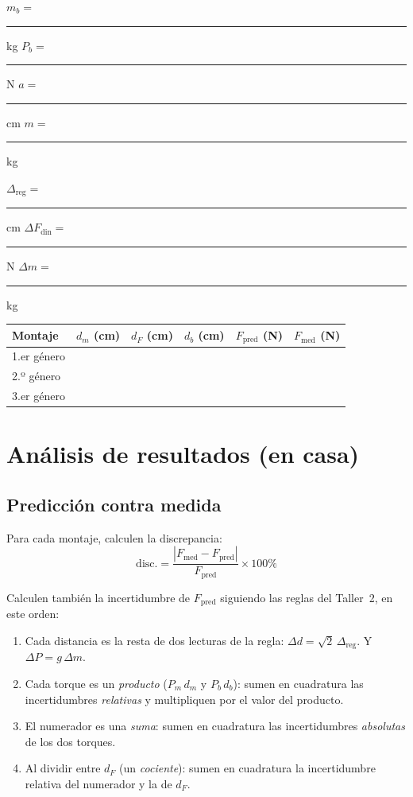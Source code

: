 \documentclass[11pt, letterpaper]{article}
\begin{document}
	\vspace{0.2cm}
	\begin{center}
		\small
		$m_b = $ \rule{1.3cm}{0.4pt} kg
		\quad
		$P_b = $ \rule{1.3cm}{0.4pt} N
		\quad
		$a = $ \rule{1.3cm}{0.4pt} cm
		\quad
		$m = $ \rule{1.3cm}{0.4pt} kg
		
		\vspace{0.15cm}
		$\Delta_{\text{reg}} = $ \rule{1.3cm}{0.4pt} cm
		\qquad
		$\Delta F_{\text{din}} = $ \rule{1.3cm}{0.4pt} N
		\qquad
		$\Delta m = $ \rule{1.3cm}{0.4pt} kg
		
		\vspace{0.4cm}
		\setlength{\tabcolsep}{4pt}
		\begin{tabular}{|l|c|c|c|c|c|}
			\hline
			Montaje & $d_m$ (cm) & $d_F$ (cm) & $d_b$ (cm)
			& $F_{\text{pred}}$ (N) & $F_{\text{med}}$ (N) \\
			\hline
			\rule{0pt}{3ex} 1.er género & & & & & \\ \hline
			\rule{0pt}{3ex} 2.º género & & & & & \\ \hline
			\rule{0pt}{3ex} 3.er género & & & & & \\ \hline
		\end{tabular}
	\end{center}
	
	\section{Análisis de resultados (en casa)}\label{sec:analisis}
	
	\subsection{Predicción contra medida}
	
	Para cada montaje, calculen la discrepancia:
	\[
	\text{disc.} = \frac{|F_{\text{med}} - F_{\text{pred}}|}{F_{\text{pred}}}\times 100\%
	\]
	
	\noindent
	Calculen también la incertidumbre de $F_{\text{pred}}$ siguiendo las reglas
	del Taller~2, en este orden:
	\begin{enumerate}
		\item Cada distancia es la resta de dos lecturas de la regla:
		$\Delta d = \sqrt{2}\,\Delta_{\text{reg}}$. Y $\Delta P = g\,\Delta m$.
		\item Cada torque es un \emph{producto} ($P_m\,d_m$ y $P_b\,d_b$): sumen
		en cuadratura las incertidumbres \emph{relativas} y multipliquen por el
		valor del producto.
		\item El numerador es una \emph{suma}: sumen en cuadratura las
		incertidumbres \emph{absolutas} de los dos torques.
		\item Al dividir entre $d_F$ (un \emph{cociente}): sumen en cuadratura la
		incertidumbre relativa del numerador y la de $d_F$.
	\end{enumerate}
	
\end{document}
